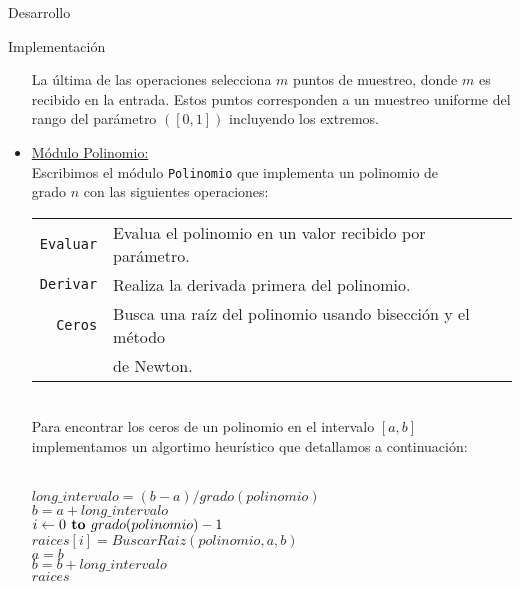 \begin{section}{Desarrollo}
\begin{subsection}{Implementación}
\begin{itemize}
				La última de las operaciones selecciona $m$ puntos de muestreo, donde $m$ es recibido en la entrada.
				Estos puntos corresponden a un muestreo uniforme del rango del parámetro $([0,1])$ incluyendo los extremos.\\
				
				\item \underline{Módulo Polinomio:}\\
				Escribimos el módulo \texttt{Polinomio} que implementa un polinomio de\\
				grado $n$ con las siguientes operaciones:\\
				
				\begin{tabular}{rl}
					\texttt{Evaluar} & Evalua el polinomio en un valor recibido por parámetro.\\
					\texttt{Derivar} & Realiza la derivada primera del polinomio.\\
					\texttt{Ceros}   & Busca una raíz del polinomio usando bisección y el método\\
									 & de Newton.\\
				\end{tabular}\\ 
				
				Para encontrar los ceros de un polinomio en el intervalo $[a,b]$ implementamos un algortimo heurístico que detallamos a continuación:\\
				
				\begin{pseudo}
					\\
					\tab $long\_intervalo = (b-a)/grado(polinomio)$\\
					\tab $b = a+long\_intervalo$\\
					\tab \FOR $i\gets 0 \textbf{ to } grado(polinomio)-1$\\
					\tab\tab\tab $raices[i] = BuscarRaiz(polinomio,a,b)$\\
					\tab\tab\tab $a = b$\\
					\tab\tab\tab $b = b + long\_intervalo$\\
					\tab \RET $raices$\\
				\end{pseudo}
		

\end{itemize}
\end{subsection}
\end{section}
